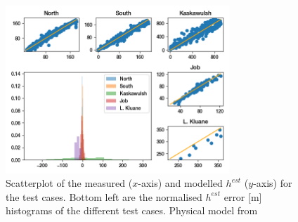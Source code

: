 \documentclass[a4, 12pt]{article}
\begin{document}
\begin{figure}[h!]
\centering
\includegraphics[width=0.75\textwidth]{../imgs/fiveplot_glate_farinotti_full.png}
\caption{Scatterplot of the measured ($x$-axis) and modelled $h^{est}$ ($y$-axis) for the test cases. Bottom left are the normalised $h^{est}$ error [m] histograms of the different test cases. Physical model from \citet{farinotti2019consensus}}
\label{fig:fglate_xy}
\end{figure}
\end{document}
